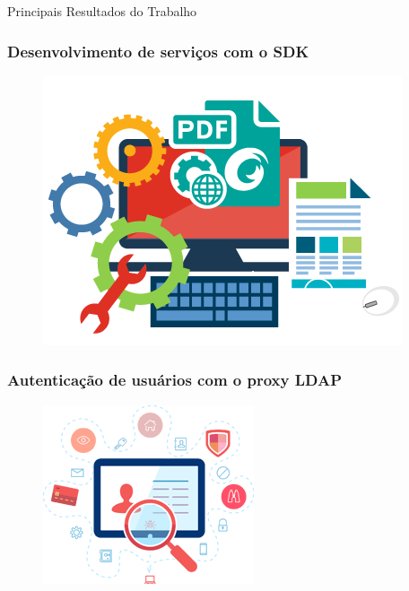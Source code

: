 \documentclass{beamer}
\begin{document}
\begin{frame}[c]{ }
\centering
  \huge{Principais Resultados do Trabalho}
\end{frame}



\begin{frame}
  \frametitle{Desenvolvimento de serviços com o SDK}

	\begin{figure}
	\centering
		\includegraphics[scale=0.4]{img/sdk.png}
	\end{figure}
  
\end{frame}


\begin{frame}
  \frametitle{Autenticação de usuários com o proxy LDAP}

	\begin{figure}
	\centering
		\includegraphics[scale=0.6]{img/ldap.png}
	\end{figure}
  
\end{frame}
\end{document}
